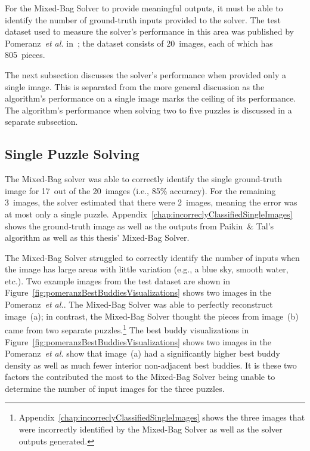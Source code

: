 For the Mixed-Bag Solver to provide meaningful outputs, it must be able to identify the number of ground-truth inputs provided to the solver.  The test dataset used to measure the solver's performance in this area was published by Pomeranz~\textit{et al.} in~\cite{pomeranzBenchmarkImages}; the dataset consists of 20~images, each of which has 805~pieces.

The next subsection discusses the solver's performance when provided only a single image.  This is separated from the more general discussion as the algorithm's performance on a single image marks the ceiling of its performance.  The algorithm's performance when solving two to five puzzles is discussed in a separate subsection.

\subsection{Single Puzzle Solving}

The Mixed-Bag solver was able to correctly identify the single ground-truth image for  17~out of the 20~images (i.e., 85\% accuracy).  For the remaining 3~images, the solver estimated that there were 2~images, meaning the error was at most only a single puzzle.  Appendix~\ref{chap:incorreclyClassifiedSingleImages} shows the ground-truth image as well as the outputs from Paikin~\& Tal's algorithm as well as this thesis' Mixed-Bag Solver.  

The Mixed-Bag Solver struggled to correctly identify the number of inputs when the image has large areas with little variation (e.g., a blue sky, smooth water, etc.). Two example images from the test dataset are shown in Figure~\ref{fig:pomeranzBestBuddiesVisualizations} shows two images in the Pomeranz~\textit{et al.}.  The Mixed-Bag Solver was able to perfectly reconstruct image~(a); in contrast, the Mixed-Bag Solver thought the pieces from image~(b) came from two separate puzzles.\footnote{Appendix~\ref{chap:incorreclyClassifiedSingleImages} shows the three images that were incorrectly identified by the Mixed-Bag Solver as well as the solver outputs generated.} The best buddy visualizations in Figure~\ref{fig:pomeranzBestBuddiesVisualizations} shows two images in the Pomeranz~\textit{et al.} show that image~(a) had a significantly higher best buddy density as well as much fewer interior non-adjacent best buddies.  It is these two factors the contributed the most to the Mixed-Bag Solver being unable to determine the number of input images for the three puzzles. 


